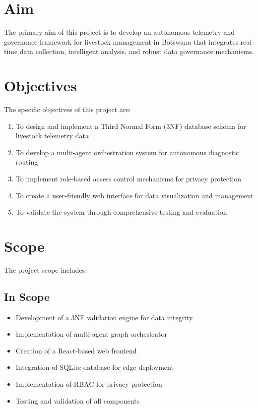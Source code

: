 \section{Aim}

The primary aim of this project is to develop an autonomous telemetry and governance framework for livestock management in Botswana that integrates real-time data collection, intelligent analysis, and robust data governance mechanisms.

\section{Objectives}

The specific objectives of this project are:

\begin{enumerate}
    \item To design and implement a Third Normal Form (3NF) database schema for livestock telemetry data
    \item To develop a multi-agent orchestration system for autonomous diagnostic routing
    \item To implement role-based access control mechanisms for privacy protection
    \item To create a user-friendly web interface for data visualization and management
    \item To validate the system through comprehensive testing and evaluation
\end{enumerate}

\section{Scope}

The project scope includes:

\subsection{In Scope}
\begin{itemize}
    \item Development of a 3NF validation engine for data integrity
    \item Implementation of multi-agent graph orchestrator
    \item Creation of a React-based web frontend
    \item Integration of SQLite database for edge deployment
    \item Implementation of RBAC for privacy protection
    \item Testing and validation of all components
\end{itemize}

